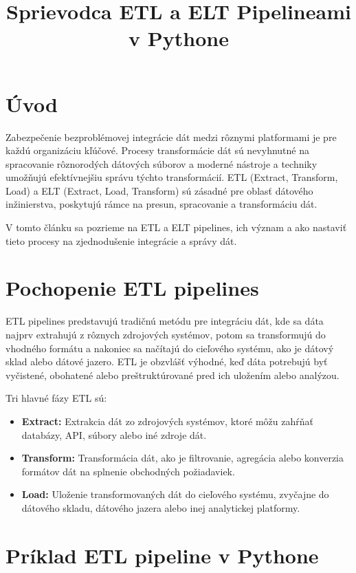 \documentclass{article}
\title{Sprievodca ETL a ELT Pipelineami v Pythone}
\author{}
\date{}
\begin{document}
\maketitle

\section{Úvod}

Zabezpečenie bezproblémovej integrácie dát medzi rôznymi platformami je pre každú organizáciu kľúčové. Procesy transformácie dát sú nevyhnutné na spracovanie rôznorodých dátových súborov a moderné nástroje a techniky umožňujú efektívnejšiu správu týchto transformácií. ETL (Extract, Transform, Load) a ELT (Extract, Load, Transform) sú zásadné pre oblasť dátového inžinierstva, poskytujú rámce na presun, spracovanie a transformáciu dát.

V tomto článku sa pozrieme na ETL a ELT pipelines, ich význam a ako nastaviť tieto procesy na zjednodušenie integrácie a správy dát.

\section{Pochopenie ETL pipelines}

ETL pipelines predstavujú tradičnú metódu pre integráciu dát, kde sa dáta najprv extrahujú z rôznych zdrojových systémov, potom sa transformujú do vhodného formátu a nakoniec sa načítajú do cieľového systému, ako je dátový sklad alebo dátové jazero. ETL je obzvlášť výhodné, keď dáta potrebujú byť vyčistené, obohatené alebo preštruktúrované pred ich uložením alebo analýzou.

Tri hlavné fázy ETL sú:

\begin{itemize}
    \item \textbf{Extract:} Extrakcia dát zo zdrojových systémov, ktoré môžu zahŕňať databázy, API, súbory alebo iné zdroje dát.
    \item \textbf{Transform:} Transformácia dát, ako je filtrovanie, agregácia alebo konverzia formátov dát na splnenie obchodných požiadaviek.
    \item \textbf{Load:} Uloženie transformovaných dát do cieľového systému, zvyčajne do dátového skladu, dátového jazera alebo inej analytickej platformy.
\end{itemize}

\section{Príklad ETL pipeline v Pythone}
\end{document}
